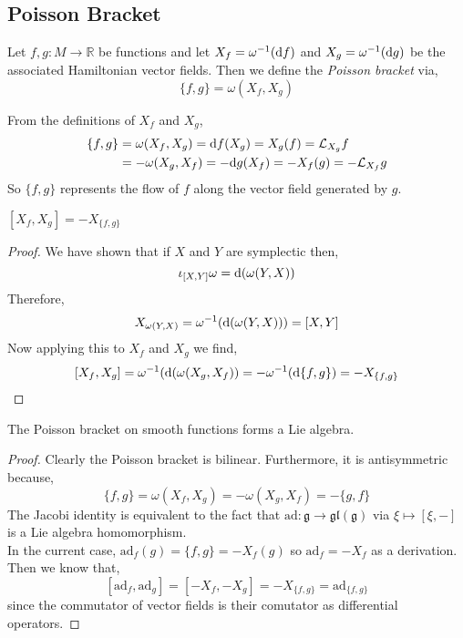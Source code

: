 \documentclass[12pt]{extarticle}
\renewcommand{\L}{\mathcal{L}}
\newcommand{\R}{\mathbb{R}}
\begin{document}
\subsection{Poisson Bracket}

\begin{definition}
Let $f, g : M \to \R$ be functions and let $X_f = \omega^{-1}(\mathrm{d}{f})$ and $X_g = \omega^{-1}(\mathrm{d}{g})$ be the associated Hamiltonian vector fields. Then we define the \textit{Poisson bracket} via,
\[ \{ f, g \} = \omega(X_f, X_g) \] 
\end{definition}

\begin{remark}
From the definitions of $X_f$ and $X_g$,
\begin{align*}
\{ f, g \} & = \omega(X_f, X_g) = \d{f}(X_g) = X_g(f) = \L_{X_g} f
\\
& = - \omega(X_g, X_f) = -\d{g}(X_f) = - X_f(g) = - \L_{X_f} g
\end{align*}
So $\{ f, g \}$ represents the flow of $f$ along the vector field generated by $g$. 
\end{remark}

\begin{lemma}
$[X_f, X_g] = - X_{\{ f, g \}}$ 
\end{lemma}

\begin{proof}
We have shown that if $X$ and $Y$ are symplectic then,
\[ \iota_{[X,Y]} \omega = \mathrm{d}{(\omega(Y, X))} \]
Therefore,
\[ X_{\omega(Y, X)} = \omega^{-1}(\mathrm{d}{(\omega(Y, X))}) = [X, Y] \]
Now applying this to $X_f$ and $X_g$ we find,
\[ [X_f, X_g] = \omega^{-1}(\mathrm{d}{(\omega(X_g, X_f)}) = - \omega^{-1}(\mathrm{d} \{f, g \}) = - X_{\{ f, g \}} \]
\end{proof}

\begin{proposition}
The Poisson bracket on smooth functions forms a Lie algebra.
\end{proposition}

\newcommand{\ad}{\mathrm{ad}}

\begin{proof}
Clearly the Poisson bracket is bilinear. Furthermore, it is antisymmetric because,
\[ \{ f ,g \} = \omega(X_f, X_g) = - \omega(X_g, X_f) = - \{ g, f \} \]
The Jacobi identity is equivalent to the fact that $\ad : \mathfrak{g} \to \mathfrak{gl}(\mathfrak{g})$ via $\xi \mapsto [\xi, -]$ is a Lie algebra homomorphism. 
\bigskip\\
In the current case, $\ad_f(g) = \{ f, g \} = -X_f(g)$ so $\ad_f = -X_f$ as a derivation. Then we know that,
\[ [ \ad_f, \ad_g] = [-X_f, -X_g] = - X_{\{f, g\}} = \ad_{\{f, g \}} \]
since the commutator of vector fields is their comutator as differential operators. 
\end{proof}
\end{document}
